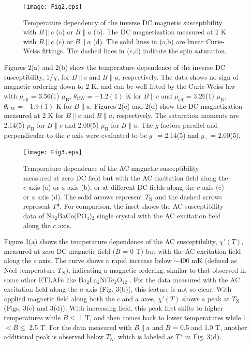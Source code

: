 \documentclass[aps,twocolumn,superscriptaddress,showpacs]{revtex4-1}
\begin{document}
\begin{figure}
\texttt{[image: Fig2.eps]}
\caption{Temperature dependency of the inverse DC magnetic susceptibility with $B \parallel c$ (a) or $B \parallel a$ (b). The DC magnetization measured at 2 K with $B \parallel c$ (c) or $B \parallel a$ (d). The solid lines in (a,b) are linear Curie-Weiss fittings. The dashed lines in (c,d) indicate the spin saturation.}
\label{ACT}
\end{figure}

Figures 2(a) and 2(b) show the temperature dependence of the inverse DC susceptibility, 1/$\chi$, for $B \parallel c$ and $B \parallel a$, respectively. The data shows no sign of magnetic ordering down to 2 K. and can be well fitted by the Curie-Weiss law with $\mu_{\text{eff}}$ = 3.56(1) $\mu_{\text{B}}$, $\theta_{\text{CW}} = -1.2(1)$ K for $B \parallel c$ and $\mu_{\text{eff}}$ = 3.26(1) $\mu_{\text{B}}$, $\theta_{\text{CW}} = -1.9(1)$ K for $B \parallel a$. Figures 2(c) and 2(d) show the DC magnetization measured at 2 K for $B \parallel c$ and $B \parallel a$, respectively. The saturation moments are 2.14(5) $\mu_{\text{B}}$ for $B \parallel c$ and 2.00(5) $\mu_{\text{B}}$ for $B \parallel a$. The $g$ factors parallel and perpendicular to the $c$ axis were evaluated to be $g_{\parallel}$ = 2.14(5) and $g_{\perp}$ = 2.00(5).

\begin{figure}
\texttt{[image: Fig3.eps]}
\caption{Temperature dependence of the AC magnetic susceptibility measured at zero DC field but with the AC excitation field along the $c$ axis (a) or $a$ axis (b), or at different DC fields along the $c$ axis (c) or $a$ axis (d). The solid arrows represent $T_{\text{N}}$ and the dashed arrows represent $T$*. For comparison, the inset shows the AC susceptibility data of Na$_2$BaCo(PO$_4$)$_2$ single crystal with the AC excitation field along the $c$ axis.}
\label{ACT2}
\end{figure}

Figure 3(a) shows the temperature dependence of the AC susceptibility, $\chi'(T)$, measured at zero DC magnetic field ($B$ = 0 T) but with the AC excitation field along the $c$ axis. The curve shows a rapid increase below $\sim$400 mK (defined as N\'eel temperature $T_{\text{N}}$), indicating a magnetic ordering, similar to that observed in some other ETLAFs
like Ba$_2$La$_2$NiTe$_2$O$_{12}$ \cite{PhysRevB.100.064417}. For the data measured with the AC excitation field along the $a$ axis (Fig. 3(b)), this feature is not so clear. With applied magnetic field along both the $c$ and $a$ axes, $\chi'(T)$ shows a peak at $T_{\text{N}}$ (Figs. 3(c) and 3(d)). With increasing field, this peak first shifts to higher temperatures while $B \leq$ 1 T, and then comes back to lower temperatures while 1 $< B \leq$ 2.5 T. For the data measured with $B \parallel a$ and $B$ = 0.5 and 1.0 T, another additional peak is observed below $T_{\text{N}}$, which is labeled as $T$* in Fig. 3(d).
\end{document}
